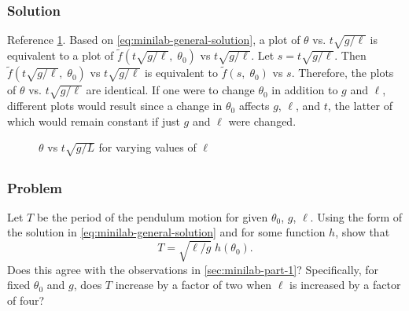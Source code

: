 \documentclass[12pt,twoside]{article}
\begin{document}
  \subsubsection*{Solution}
  Reference \cref{fig:minilab-part-2-solution}. Based on
  \cref{eq:minilab-general-solution}, a plot of $\theta$ vs. $t\sqrt{g/\ell}$ is
  equivalent to a plot of $\tilde{f}(t\sqrt{g/\ell}, \;\theta_0)$ vs
  $t\sqrt{g/\ell}$. Let $s = t\sqrt{g/\ell}$. Then $\tilde{f}(t\sqrt{g/\ell},
  \;\theta_0)$ vs $t\sqrt{g/\ell}$ is equivalent to $\tilde{f}(s, \;\theta_0)$
  vs $s$. Therefore, the plots of $\theta$ vs. $t\sqrt{g/\ell}$ are identical.
  If one were to change $\theta_0$ in addition to $g$ and $\ell$, different
  plots would result since a change in $\theta_0$ affects $g$, $\ell$, and $t$,
  the latter of which would remain constant if just $g$ and $\ell$ were changed.
  \begin{figure}
    \centering
    \caption{$\theta$ vs $t\sqrt{g/L}$ for varying values of $\ell$}
\label{fig:minilab-part-2-solution}
  \end{figure}

\subsection{}
  \subsubsection*{Problem}
  Let $T$ be the period of the pendulum motion for given $\theta_0$, $g$,
  $\ell$. Using the form of the solution in \cref{eq:minilab-general-solution}
  and for some function $h$, show that
  \begin{equation}
    \label{eq:2-3-prob}
    T=\sqrt{\ell/g}\;h(\theta_0).
  \end{equation}
  Does this agree with the observations in \cref{sec:minilab-part-1}?
  Specifically, for fixed $\theta_0$ and $g$, does $T$ increase by a factor of
  two when $\ell$ is increased by a factor of four?
\end{document}
